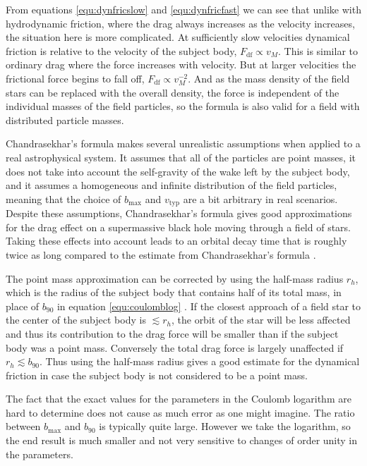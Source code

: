 \documentclass[english, oneside]{HYgradu}
\begin{document}
From equations \ref{equ:dynfricslow} and \ref{equ:dynfricfast} we can see that unlike with hydrodynamic friction, where the drag always increases as the velocity increases, the situation here is more complicated. At sufficiently slow velocities dynamical friction is relative to the velocity of the subject body, $F_{\mathrm{df}} \propto v_M$. This is similar to ordinary drag where the force increases with velocity. But at larger velocities the frictional force begins to fall off, $F_{\mathrm{df}} \propto v_M^{-2}$. And as the mass density of the field stars can be replaced with the overall density, the force is independent of the individual masses of the field particles, so the formula is also valid for a field with distributed particle masses.

Chandrasekhar's formula makes several unrealistic assumptions when applied to a real astrophysical system. It assumes that all of the particles are point masses, it does not take into account the self-gravity of the wake left by the subject body, and it assumes a homogeneous and infinite distribution of the field particles, meaning that the choice of $b_\mathrm{max}$ and $v_\mathrm{typ}$ are a bit arbitrary in real scenarios. Despite these assumptions, Chandrasekhar's formula gives good approximations for the drag effect on a supermassive black hole moving through a field of stars. Taking these effects into account leads to an orbital decay time that is roughly twice as long compared to the estimate from Chandrasekhar's formula \citep{weinberg:1989}.

The point mass approximation can be corrected by using the half-mass radius $r_h$, which is the radius of the subject body that contains half of its total mass, in place of $b_{90}$ in equation \ref{equ:coulomblog} \citep{bt-galdyn}. If the closest approach of a field star to the center of the subject body is $\lesssim r_h$, the orbit of the star will be less affected and thus its contribution to the drag force will be smaller than if the subject body was a point mass. Conversely the total drag force is largely unaffected if $r_h \lesssim b_{90}$. Thus using the half-mass radius gives a good estimate for the dynamical friction in case the subject body is not considered to be a point mass.

The fact that the exact values for the parameters in the Coulomb logarithm are hard to determine does not cause as much error as one might imagine. The ratio between $b_\mathrm{max}$ and $b_{90}$ is typically quite large. However we take the logarithm, so the end result is much smaller and not very sensitive to changes of order unity in the parameters. 
\end{document}

